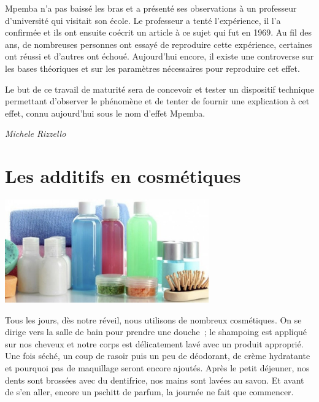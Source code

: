\documentclass[
  10pt,
  french,
  a5paper,
  openany]{book}
\newenvironment{signature}{\begin{flushright}}{\end{flushright}}
\begin{document}
Mpemba n'a pas baissé les bras et a présenté ses observations à un professeur d'université qui visitait son école. Le professeur a tenté l'expérience, il l'a confirmée et ils ont ensuite coécrit un article à ce sujet qui fut en 1969. Au fil des ans, de nombreuses personnes ont essayé de reproduire cette expérience, certaines ont réussi et d'autres ont échoué. Aujourd'hui encore, il existe une controverse sur les bases théoriques et sur les paramètres nécessaires pour reproduire cet effet.

Le but de ce travail de maturité sera de concevoir et tester un dispositif technique permettant d'observer le phénomène et de tenter de fournir une explication à cet effet, connu aujourd'hui sous le nom d'effet Mpemba.

\begin{signature}
\emph{Michele Rizzello}

\end{signature}

\hypertarget{les-additifs-en-cosmuxe9tiques}{%
\chapter{Les additifs en cosmétiques}\label{les-additifs-en-cosmuxe9tiques}}

\begin{center}
\includegraphics[width=\textwidth,height=12em]{images/les-additifs-en-cosmetiques.jpg}

\end{center}


Tous les jours, dès notre réveil, nous utilisons de nombreux cosmétiques. On se dirige vers la salle de bain pour prendre une douche~; le shampoing est appliqué sur nos cheveux et notre corps est délicatement lavé avec un produit approprié. Une fois séché, un coup de rasoir puis un peu de déodorant, de crème hydratante et pourquoi pas de maquillage seront encore ajoutés. Après le petit déjeuner, nos dents sont brossées avec du dentifrice, nos mains sont lavées au savon. Et avant de s'en aller, encore un pschitt de parfum, la journée ne fait que commencer.
\end{document}
